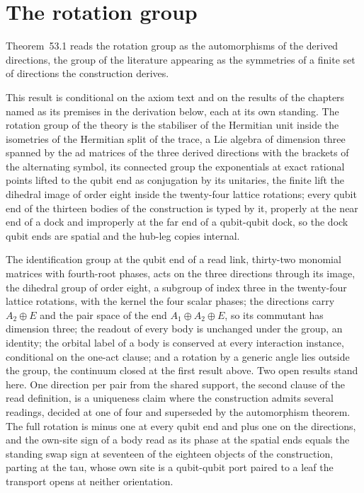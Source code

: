 \section{The rotation group}\label{mod:III-2-rotation-group}
\label{narr:open:3-2}Theorem~53.1 reads the rotation group as the automorphisms of the derived directions, the group of the literature appearing as the symmetries of a finite set of directions the construction derives.
\begin{chconditional}\label{box:III-2-rotation-group:1}
This result is conditional on the axiom text and on the results of the chapters named as its premises in the derivation below, each at its own standing.
The rotation group of the theory is the stabiliser of the Hermitian unit inside the isometries of the Hermitian split of the trace, a Lie algebra of dimension three spanned by the ad matrices of the three derived directions with the brackets of the alternating symbol, its connected group the exponentials at exact rational points lifted to the qubit end as conjugation by its unitaries, the finite lift the dihedral image of order eight inside the twenty-four lattice rotations; every qubit end of the thirteen bodies of the construction is typed by it, properly at the near end of a dock and improperly at the far end of a qubit-qubit dock, so the dock qubit ends are spatial and the hub-leg copies internal.
\end{chconditional}
The identification group at the qubit end of a read link, thirty-two monomial matrices with fourth-root phases, acts on the three directions through its image, the dihedral group of order eight, a subgroup of index three in the twenty-four lattice rotations, with the kernel the four scalar phases; the directions carry $A_2 \oplus E$ and the pair space of the end $A_1 \oplus A_2 \oplus E$, so its commutant has dimension three; the readout of every body is unchanged under the group, an identity; the orbital label of a body is conserved at every interaction instance, conditional on the one-act clause; and a rotation by a generic angle lies outside the group, the continuum closed at the first result above.
Two open results stand here. One direction per pair from the shared support, the second clause of the read definition, is a uniqueness claim where the construction admits several readings, decided at one of four and superseded by the automorphism theorem. The full rotation is minus one at every qubit end and plus one on the directions, and the own-site sign of a body read as its phase at the spatial ends equals the standing swap sign at seventeen of the eighteen objects of the construction, parting at the tau, whose own site is a qubit-qubit port paired to a leaf the transport opens at neither orientation.
